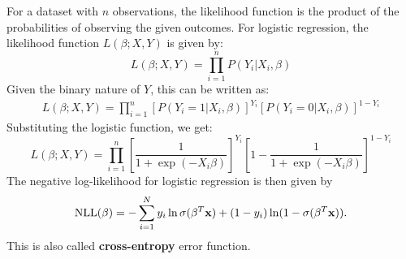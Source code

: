 For a dataset with \( n \) observations, the likelihood function is the product of the probabilities of observing the given outcomes. For logistic regression, the likelihood function \( L(\beta; X, Y) \) is given by:
\[
L(\beta; X, Y) = \prod_{i=1}^{n} P(Y_i | X_i, \beta)
\]
Given the binary nature of \( Y \), this can be written as:
\begin{align*}
	L(\beta; X, Y) = \prod_{i=1}^{n} [P(Y_i = 1 | X_i, \beta)]^{Y_i} [P(Y_i = 0 | X_i, \beta)]^{1 - Y_i}
\end{align*}
Substituting the logistic function, we get:
\[
L(\beta; X, Y) = \prod_{i=1}^{n} \left[\frac{1}{1 + \exp(-X_i \beta)}\right]^{Y_i} \left[1 - \frac{1}{1 + \exp(-X_i \beta)}\right]^{1 - Y_i}
\]
The negative log-likelihood for logistic regression is then given by
\begin{align*}
	\textrm{NLL}(\beta) = -\sum_{i=1}^N y_i\ln\sigma(\beta^T{\mathbf{x}})+(1-y_i)\ln(1-\sigma(\beta^T{\mathbf{x}})).
\end{align*}
This is also called \textbf{cross-entropy} error function. 


